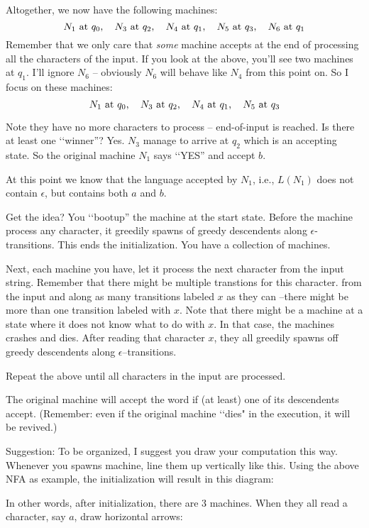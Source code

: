 Altogether, we now have the following machines:
\[
\text{$N_1$ at $q_0$, \,\,\,
  $N_3$ at $q_2$, \,\,\, $N_4$ at $q_1$, \,\,\,
  $N_5$ at $q_3$, \,\,\,
  $N_6$ at $q_1$}
\]
Remember that we only care that \textit{some} machine accepts
at the end of processing all the characters of the input.
If you look at the above, you'll see two machines at $q_1$.
I'll ignore $N_6$ -- obviously $N_6$ will behave like $N_4$ from this point on.
So I focus on these machines:
\[
\text{$N_1$ at $q_0$, \,\,\,
  $N_3$ at $q_2$, \,\,\, $N_4$ at $q_1$, \,\,\,
  $N_5$ at $q_3$}
\]

Note they have no more characters to process -- end-of-input is reached.
Is there at least one \lq\lq winner''? Yes. 
$N_3$ manage to arrive at $q_2$ which is an accepting state. 
So the original machine $N_1$ says \lq\lq YES'' and accept $b$.

At this point we know that the language accepted by $N_1$, i.e., 
$L(N_1)$ does not contain $\epsilon$, but contains both $a$ and $b$.

Get the idea? You \lq\lq bootup'' 
the machine at the start state. 
Before the machine process any character, it greedily spawns of greedy descendents along $\epsilon$-transitions.
This ends the initialization.
You have a collection of machines.

Next, each machine you have, let it process the next character from the
input string.
Remember that there might be multiple transtions for this character.
from the input and along as many transitions labeled $x$ as they can
--there might be more than one transition labeled with $x$.
Note that there might be a machine at a state where it does not
know what to do with $x$.
In that case, the machines crashes and dies.
After reading that character $x$,
they all greedily spawns off greedy descendents along $\epsilon$--transitions.

Repeat the above until all characters in the input are processed.

The original machine will accept the word if (at least) one of its
descendents accept.
(Remember: even if the original machine \lq\lq dies" in the
execution, it will be revived.)

Suggestion: To be organized, I suggest you draw your computation this way.
Whenever you spawns machine, line them up vertically like this.
Using the above NFA as example, the initialization will result in
this diagram:



In other words, after initialization, there are 3 machines.
When they all read a character, say $a$, draw horizontal arrows:

